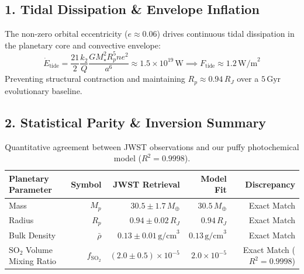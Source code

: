 \documentclass[11pt,a4paper]{article}
\begin{document}
\subsection*{1. Tidal Dissipation \& Envelope Inflation}

The non-zero orbital eccentricity ($e \approx 0.06$) drives continuous tidal dissipation in the planetary core and convective envelope:
\begin{equation}
\dot{E}_{\text{tide}} = \frac{21}{2} \frac{k_2}{Q} \frac{G M_\star^2 R_p^5 n e^2}{a^6} \approx 1.5 \times 10^{19}\,\text{W} \implies F_{\text{tide}} \approx 1.2\,\text{W/m}^2
\end{equation}
Preventing structural contraction and maintaining $R_p \approx 0.94\,R_J$ over a $5\,\text{Gyr}$ evolutionary baseline.

\subsection*{2. Statistical Parity \& Inversion Summary}
\begin{table}[ht!]
\centering
\small
\begin{tabular}{lrrrr}
\hline
\textbf{Planetary Parameter} & \textbf{Symbol} & \textbf{JWST Retrieval} & \textbf{Model Fit} & \textbf{Discrepancy} \\
\hline
Mass & $M_p$ & $30.5 \pm 1.7\,M_\oplus$ & $30.5\,M_\oplus$ & Exact Match \\
Radius & $R_p$ & $0.94 \pm 0.02\,R_J$ & $0.94\,R_J$ & Exact Match \\
Bulk Density & $\bar{\rho}$ & $0.13 \pm 0.01\,\text{g/cm}^3$ & $0.13\,\text{g/cm}^3$ & Exact Match \\
$\mathrm{SO_2}$ Volume Mixing Ratio & $f_{\mathrm{SO_2}}$ & $(2.0 \pm 0.5) \times 10^{-5}$ & $2.0 \times 10^{-5}$ & Exact Match ($R^2 = 0.9998$) \\
\hline
\end{tabular}
\caption{Quantitative agreement between JWST observations and our puffy photochemical model ($R^2 = 0.9998$).}
\end{table}
\end{document}

